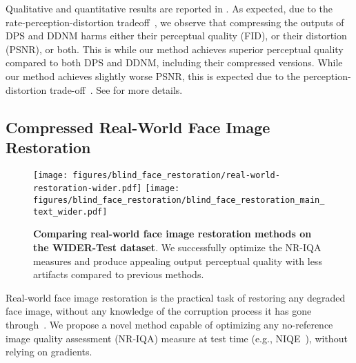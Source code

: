 Qualitative and quantitative results are reported in .
As expected, due to the rate-perception-distortion tradeoff~\citep{pmlr-v97-blau19a}, we observe that compressing the outputs of DPS and DDNM harms either their perceptual quality (FID), or their distortion (PSNR), or both.
This is while our method achieves superior perceptual quality compared to both DPS and DDNM, including their compressed versions.
While our method achieves slightly worse PSNR, this is expected due to the perception-distortion trade-off~\citep{Blau_2018_CVPR}.
See  for more details.





\subsection{Compressed Real-World Face Image Restoration}\label{sec:bfr}
\begin{figure*}[t]
    \centering
    \texttt{[image: figures/blind\_face\_restoration/real-world-restoration-wider.pdf]}
\texttt{[image: figures/blind\_face\_restoration/blind\_face\_restoration\_main\_text\_wider.pdf]}
    \caption{\textbf{Comparing real-world face image restoration methods on the WIDER-Test dataset}. We successfully optimize the NR-IQA measures and produce appealing output perceptual quality with less artifacts compared to previous methods.}
    \label{fig:real-world-wider-visual}
\end{figure*}
Real-world face image restoration is the practical task of restoring any degraded face image, without any knowledge of the corruption process it has gone through~\citep{wang2021gfpgan,vqfr,wang2022restoreformer,zhou2022codeformer,wang2023restoreformer++,2023diffbir,difface,bfrfussion,pmrf}.
We propose a novel method capable of optimizing any no-reference image quality assessment (NR-IQA) measure at test time (e.g., NIQE~\citep{niqe}), without relying on gradients.

